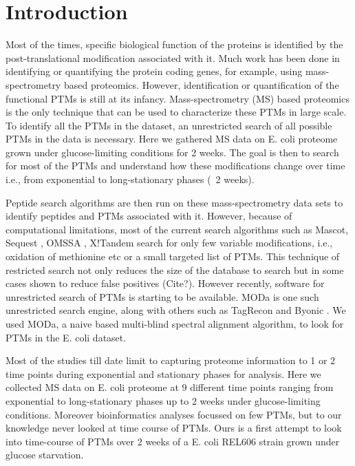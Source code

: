 \documentclass[12pt]{article}
\begin{document}
\section{Introduction}

Most of the times, specific biological function of the proteins is identified by the post-translational modification associated with it. Much work has been done in identifying or quantifying the protein coding genes, for example, using mass-spectrometry based proteomics. However, identification or quantification of the functional PTMs is still at its infancy. Mass-spectrometry (MS) based proteomics is the only technique that can be used to characterize these PTMs in large scale. To identify all the PTMs in the dataset, an unrestricted search of all possible PTMs in the data is necessary. Here we gathered MS data on E. coli proteome grown under glucose-limiting conditions for 2 weeks. The goal is then to search for most of the PTMs and understand how these modifications change over time i.e., from exponential to long-stationary phases (~2 weeks).

Peptide search algorithms are then run on these mass-spectrometry data sets to identify peptides and PTMs associated with it. However, because of computational limitations, most of the current search algorithms such as Mascot\cite{Perkinsetal1999}, Sequest \cite{Engetal1994}, OMSSA \cite{Geeretal2004}, X!Tandem \cite{CraigBeavis2004} search for only few variable modifications, i.e., oxidation of methionine etc or a small targeted list of PTMs. This technique of restricted search not only reduces the size of the database to search but in some cases shown to reduce false positives (Cite?). However recently, software for unrestricted search of PTMs is starting to be available. MODa \cite{Naetal2012} is one such unrestricted search engine, along with others such as TagRecon\cite{Dasarietal2010} and Byonic \cite{Bernetal2012}. We used MODa, a naive based multi-blind spectral alignment algorithm, to look for PTMs in the E. coli dataset. 

Most of the studies till date limit to capturing proteome information to 1 or 2 time points during exponential and stationary phases for analysis. Here we collected MS data on E. coli proteome at 9 different time points ranging from exponential to long-stationary phases up to 2 weeks under glucose-limiting conditions. Moreover bioinformatics analyses focussed on few PTMs, but to our knowledge never looked at time course of PTMs. Ours is a first attempt to look into time-course of PTMs over 2 weeks of a E. coli REL606 strain grown under glucose starvation.
\end{document}
